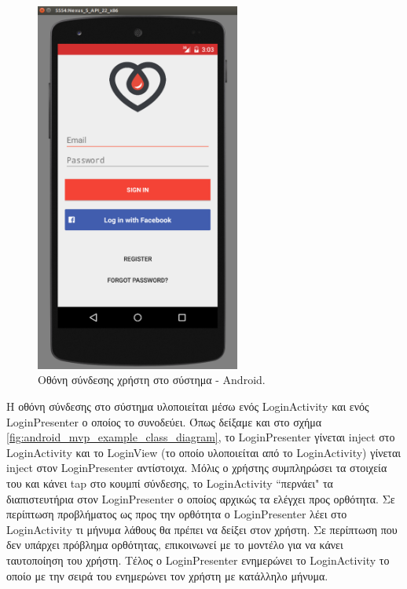 	\begin{figure}[h]
	    \centering
	    \includegraphics[width=0.6\textwidth]{LoginActivity.png}
	    \caption{Οθόνη σύνδεσης χρήστη στο σύστημα - Android.}
	    \label{fig:LoginActivity}
	\end{figure}
   		
   		
   		Η οθόνη σύνδεσης στο σύστημα υλοποιείται μέσω ενός LoginActivity και ενός LoginPresenter ο οποίος το συνοδεύει. Όπως δείξαμε και στο σχήμα \ref{fig:android_mvp_example_class_diagram}, το LoginPresenter γίνεται inject στο LoginActivity και το LoginView (το οποίο υλοποιείται από το LoginActivity) γίνεται inject στον LoginPresenter αντίστοιχα. Μόλις ο χρήστης συμπληρώσει τα στοιχεία του και κάνει tap στο κουμπί σύνδεσης, το LoginActivity ``περνάει" τα διαπιστευτήρια στον LoginPresenter ο οποίος αρχικώς τα ελέγχει προς ορθότητα. Σε περίπτωση προβλήματος ως προς την ορθότητα ο LoginPresenter λέει στο LoginActivity τι μήνυμα λάθους θα πρέπει να δείξει στον χρήστη. Σε περίπτωση που δεν υπάρχει πρόβλημα ορθότητας, επικοινωνεί με το μοντέλο για να κάνει ταυτοποίηση του χρήστη. Τέλος ο LoginPresenter ενημερώνει το LoginActivity το οποίο με την σειρά του ενημερώνει τον χρήστη με κατάλληλο μήνυμα. 
   		
